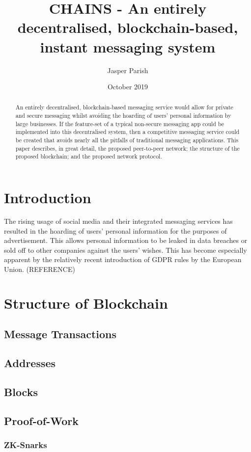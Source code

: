 \documentclass{article}
\title{CHAINS - An entirely decentralised, blockchain-based, instant messaging system}
\author{Jasper Parish}
\date{October 2019}
\begin{document}
\maketitle
\begin{abstract}
    An entirely decentralised, blockchain-based messaging service would allow for private and secure messaging whilst avoiding the hoarding of users' personal information by large businesses. If the feature-set of a typical non-secure messaging app could be implemented into this decentralised system, then a competitive messaging service could be created that avoids nearly all the pitfalls of traditional messaging applications. This paper describes, in great detail, the proposed peer-to-peer network; the structure of the proposed blockchain; and the proposed network protocol.
\end{abstract}

\section{Introduction}
The rising usage of social media and their integrated messaging services has resulted in the hoarding of users' personal information for the purposes of advertisement. This allows personal information to be leaked in data breaches or sold off to other companies against the users' wishes. This has become especially apparent by the relatively recent introduction of GDPR rules by the European Union. (REFERENCE)

\section{Structure of Blockchain}
\subsection{Message Transactions}
\subsection{Addresses}
\subsection{Blocks}
\subsection{Proof-of-Work}
\subsubsection{ZK-Snarks}
\end{document}
